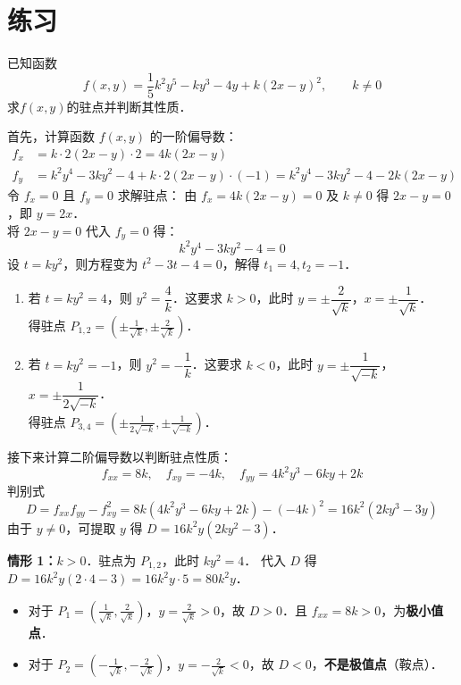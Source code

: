 \documentclass[12pt, a4paper, oneside, UTF8]{ctexbook}
\begin{document}
\section{练习}
\begin{exercise}
    已知函数 \[f(x,y)=\frac{1}{5}k^2y^5-ky^3-4y+k(2x-y)^2,\qquad k\neq 0\] 
    求$f(x,y)$的驻点并判断其性质．
\end{exercise}
\begin{solution}
    首先，计算函数 $f(x,y)$ 的一阶偏导数：
    \begin{align*}
        f_x &= k \cdot 2(2x-y) \cdot 2 = 4k(2x-y) \\
        f_y &= k^2y^4 - 3ky^2 - 4 + k \cdot 2(2x-y) \cdot (-1) = k^2y^4 - 3ky^2 - 4 - 2k(2x-y)
    \end{align*}
    令 $f_x = 0$ 且 $f_y = 0$ 求解驻点：
    由 $f_x = 4k(2x-y) = 0$ 及 $k \ne 0$ 得 $2x - y = 0$，即 $y = 2x$．\\
    将 $2x - y = 0$ 代入 $f_y = 0$ 得：
    \[ k^2y^4 - 3ky^2 - 4 = 0 \]
    设 $t = ky^2$，则方程变为 $t^2 - 3t - 4 = 0$，解得 $t_1 = 4, t_2 = -1$．
    \begin{enumerate}
        \item 若 $t = ky^2 = 4$，则 $y^2 = \dfrac{4}{k}$．这要求 $k > 0$，此时 $y = \pm \dfrac{2}{\sqrt{k}}$，$x = \pm \dfrac{1}{\sqrt{k}}$．\\
        得驻点 $P_{1,2} = \left( \pm \frac{1}{\sqrt{k}}, \pm \frac{2}{\sqrt{k}} \right)$．
        \item 若 $t = ky^2 = -1$，则 $y^2 = -\dfrac{1}{k}$．这要求 $k < 0$，此时 $y = \pm \dfrac{1}{\sqrt{-k}}$，$x = \pm \dfrac{1}{2\sqrt{-k}}$．\\
        得驻点 $P_{3,4} = \left( \pm \frac{1}{2\sqrt{-k}}, \pm \frac{1}{\sqrt{-k}} \right)$．
    \end{enumerate}

    接下来计算二阶偏导数以判断驻点性质：
    \[ f_{xx} = 8k, \quad f_{xy} = -4k, \quad f_{yy} = 4k^2y^3 - 6ky + 2k \]
    判别式 \[D = f_{xx}f_{yy} - f_{xy}^2 = 8k(4k^2y^3 - 6ky + 2k) - (-4k)^2 = 16k^2(2ky^3 - 3y)\]
    由于 $y \ne 0$，可提取 $y$ 得 $D = 16k^2y(2ky^2 - 3)$．

    \textbf{情形 1：$k > 0$}．驻点为 $P_{1,2}$，此时 $ky^2 = 4$．
    代入 $D$ 得 $D = 16k^2y(2 \cdot 4 - 3) = 16k^2y \cdot 5 = 80k^2y$．
    \begin{itemize}
        \item 对于 $P_1 = \left( \frac{1}{\sqrt{k}}, \frac{2}{\sqrt{k}} \right)$，$y = \frac{2}{\sqrt{k}} > 0$，故 $D > 0$．且 $f_{xx} = 8k > 0$，为\textbf{极小值点}．
        \item 对于 $P_2 = \left( -\frac{1}{\sqrt{k}}, -\frac{2}{\sqrt{k}} \right)$，$y = -\frac{2}{\sqrt{k}} < 0$，故 $D < 0$，\textbf{不是极值点}（鞍点）．
    \end{itemize}


\end{solution}
\end{document}
